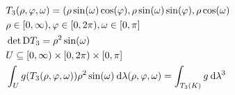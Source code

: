 \documentclass[skript.tex]{subfiles}
\begin{document}
	\begin{bsp*}
		\begin{align*}
	&	T_3(\rho,\varphi,\omega) = 	(\rho\sin(\omega)\cos(\varphi),\rho\sin(\omega)\sin(\varphi),\rho\cos(\omega) \\
	& \rho\in [0,\infty), \varphi \in [0,2\pi), \omega \in [0, \pi] \\
	& \det \text{D}T_3 = \rho^2\sin(\omega) \\
	& U \subseteq [0, \infty) \times [0,2\pi) \times [0, \pi] \\
	& \int_U g( T_3 (\rho,\varphi,\omega)) \rho^2 \sin(\omega) \: \mathrm{d} \lambda (\rho,\varphi,\omega) = \int_{T_3(K)} g \: \mathrm{d} \lambda^3
		\end{align*}
	\end{bsp*}
\end{document}
